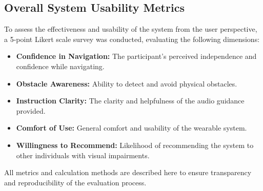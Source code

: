 \subsection{Overall System Usability Metrics}
To assess the effectiveness and usability of the system from the user perspective, a 5-point Likert scale survey was conducted, evaluating the following dimensions:
\begin{itemize}
	\item \textbf{Confidence in Navigation:} The participant’s perceived independence and confidence while navigating.
	\item \textbf{Obstacle Awareness:} Ability to detect and avoid physical obstacles.
	\item \textbf{Instruction Clarity:} The clarity and helpfulness of the audio guidance provided.
	\item \textbf{Comfort of Use:} General comfort and usability of the wearable system.
	\item \textbf{Willingness to Recommend:} Likelihood of recommending the system to other individuals with visual impairments.
\end{itemize}

All metrics and calculation methods are described here to ensure transparency and reproducibility of the evaluation process.

